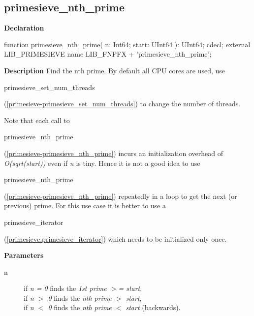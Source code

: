 \documentclass{report}
\newif\ifpdf
\begin{document}
\subsection*{primesieve{\_}nth{\_}prime}
\fi
\label{primesieve-primesieve_nth_prime}
\begin{list}{}{
\setlength{\itemindent}{0cm}
\setlength{\listparindent}{0cm}
\setlength{\leftmargin}{\evensidemargin}
\addtolength{\leftmargin}{\tmplength}
\settowidth{\labelsep}{X}
\addtolength{\leftmargin}{\labelsep}
\setlength{\labelwidth}{\tmplength}
}
\item[\textbf{Declaration}\hfill]
\ifpdf
\begin{flushleft}
\fi
\begin{ttfamily}
function primesieve{\_}nth{\_}prime( n: Int64; start: UInt64 ): UInt64; cdecl; external LIB{\_}PRIMESIEVE name LIB{\_}FNPFX + 'primesieve{\_}nth{\_}prime';\end{ttfamily}

\ifpdf
\end{flushleft}
\fi

\par
\item[\textbf{Description}]
Find the nth prime. By default all CPU cores are used, use \begin{ttfamily}primesieve{\_}set{\_}num{\_}threads\end{ttfamily}(\ref{primesieve-primesieve_set_num_threads}) to change the number of threads.

Note that each call to \begin{ttfamily}primesieve{\_}nth{\_}prime\end{ttfamily}(\ref{primesieve-primesieve_nth_prime}) incurs an initialization overhead of \textit{O(sqrt(start))} even if \textit{n} is tiny. Hence it is not a good idea to use \begin{ttfamily}primesieve{\_}nth{\_}prime\end{ttfamily}(\ref{primesieve-primesieve_nth_prime}) repeatedly in a loop to get the next (or previous) prime. For this use case it is better to use a \begin{ttfamily}primesieve{\_}iterator\end{ttfamily}(\ref{primesieve.primesieve_iterator}) which needs to be initialized only once.

\par
\item[\textbf{Parameters}]
\begin{description}
\item[n] if \textit{n = 0} finds the \textit{1st prime {$>$}= start},\\{} if \textit{n {$>$} 0} finds the \textit{nth prime {$>$} start},\\{} if \textit{n {$<$} 0} finds the \textit{nth prime {$<$} start} (backwards).
\end{description}


\end{list}
\ifpdf
\end{document}
